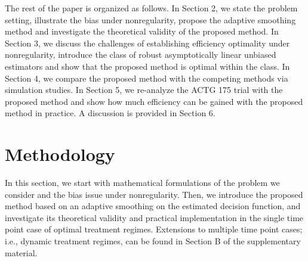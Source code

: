 \documentclass[11pt]{article}
\theoremstyle{referenceplain}
\theoremstyle{referencedefinition}
\theoremstyle{referenceremark}
\begin{document}
The rest of the paper is organized as follows. In Section 2, we state the problem setting, illustrate the bias under nonregularity, propose the adaptive smoothing method and investigate the theoretical validity of the proposed method. In Section 3, we discuss the challenges of establishing efficiency optimality under nonregularity, introduce the class of robust asymptotically linear unbiased estimators and show that the proposed method is optimal within the class. In Section 4, we compare the proposed method with the competing methods via simulation studies. In Section 5, we re-analyze the ACTG 175 trial with the proposed method and show how much efficiency can be gained with the proposed method in practice.  A discussion is provided in Section 6.

\section{Methodology}
In this section, we start with mathematical formulations of the problem we consider and the bias issue under nonregularity. Then, we introduce the proposed method based on an adaptive smoothing on the estimated decision function, and investigate its theoretical validity and practical implementation in the single time point case of optimal treatment regimes. Extensions to multiple time point cases; i.e., dynamic treatment regimes, can be found in  Section B of the supplementary material.
\end{document}

